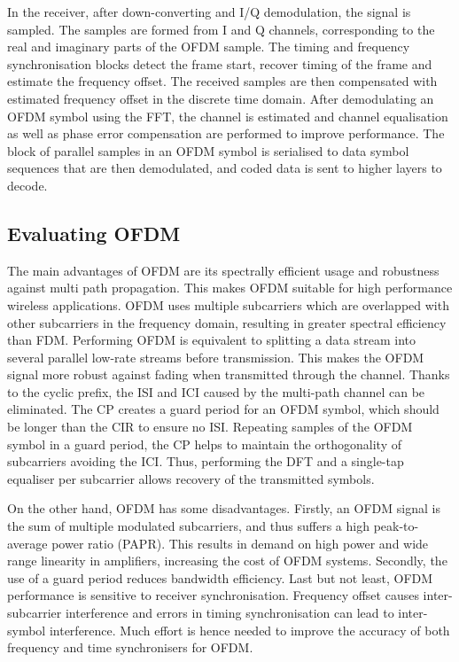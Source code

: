 In the receiver, after down-converting and I/Q demodulation, the signal is sampled. The samples are formed from I and Q channels, corresponding to the real and imaginary parts of the OFDM sample.
The timing and frequency synchronisation blocks detect the frame start, recover timing of the frame and estimate the frequency offset.
The received samples are then compensated with estimated frequency offset in the discrete time domain.
After demodulating an OFDM symbol using the FFT, the channel is estimated and channel equalisation as well as phase error compensation are performed to improve performance.
The block of parallel samples in an OFDM symbol is serialised to data symbol sequences that are then demodulated, and coded data is sent to higher layers to decode.

\subsection{Evaluating OFDM}

The main advantages of OFDM are its spectrally efficient usage and robustness against multi path propagation.
This makes OFDM suitable for high performance wireless applications.
OFDM uses multiple subcarriers which are overlapped with other subcarriers in the frequency domain, resulting in greater spectral efficiency than FDM.
Performing OFDM is equivalent to splitting a data stream into several parallel low-rate streams before transmission.
This makes the OFDM signal more robust against fading when transmitted through the channel.
Thanks to the cyclic prefix, the ISI and ICI caused by the multi-path channel can be eliminated.
The CP creates a guard period for an OFDM symbol, which should be longer than the CIR to ensure no ISI.
Repeating samples of the OFDM symbol in a guard period, the CP helps to maintain the orthogonality of subcarriers avoiding the ICI.
Thus, performing the DFT and a single-tap equaliser per subcarrier allows recovery of the transmitted symbols.

On the other hand, OFDM has some disadvantages.
Firstly, an OFDM signal is the sum of multiple modulated subcarriers, and thus suffers a high peak-to-average power ratio (PAPR).
This results in demand on high power and wide range linearity in amplifiers, increasing the cost of OFDM systems.
Secondly, the use of a guard period reduces bandwidth efficiency.
Last but not least, OFDM performance is sensitive to receiver synchronisation. Frequency offset causes inter-subcarrier interference and errors in timing synchronisation can lead to inter-symbol interference.
Much effort is hence needed to improve the accuracy of both frequency and time synchronisers for OFDM.



